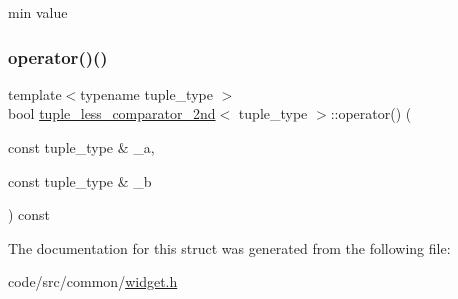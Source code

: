 min value 

\mbox{\label{structtuple__less__comparator__2nd_a323236eaaac70cda8e4c7ccbfde17fc2}} 
\subsubsection{\texorpdfstring{operator()()}{operator()()}}
{\footnotesize\ttfamily template$<$typename tuple\+\_\+type $>$ \\
bool \hyperlink{structtuple__less__comparator__2nd}{tuple\+\_\+less\+\_\+comparator\+\_\+2nd}$<$ tuple\+\_\+type $>$\+::operator() (\begin{DoxyParamCaption}\item[{const tuple\+\_\+type \&}]{\+\_\+a,  }\item[{const tuple\+\_\+type \&}]{\+\_\+b }\end{DoxyParamCaption}) const\hspace{0.3cm}{\ttfamily [inline]}}



The documentation for this struct was generated from the following file\+:\begin{DoxyCompactItemize}
\item 
code/src/common/\hyperlink{widget_8h}{widget.\+h}\end{DoxyCompactItemize}

